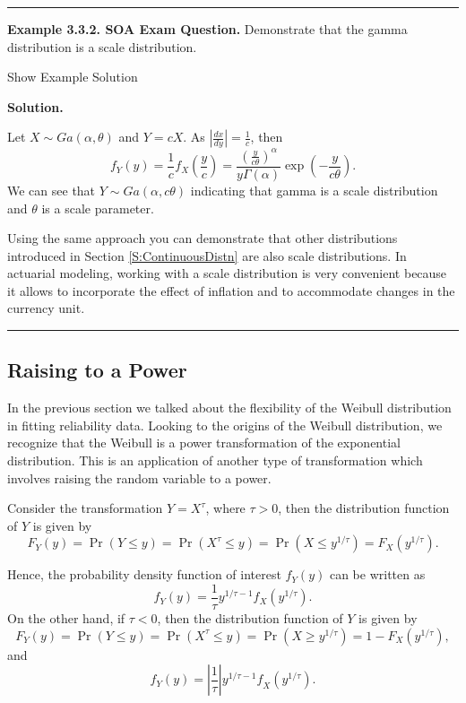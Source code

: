 \documentclass[]{book}
\theoremstyle{definition}
\theoremstyle{definition}
\theoremstyle{definition}
\theoremstyle{remark}
\begin{document}
\begin{center}\rule{0.5\linewidth}{\linethickness}\end{center}

\textbf{Example 3.3.2. SOA Exam Question.} Demonstrate that the gamma
distribution is a scale distribution.

Show Example Solution

\hypertarget{toggleExampleLoss.3.2}{}
\textbf{Solution.}

Let \(X\sim Ga(\alpha,\theta)\) and \(Y = cX\). As
\(\left| \frac{dx}{dy} \right| = \frac{1}{c}\), then
\[f_{Y}\left( y \right) = \frac{1}{c}f_{X}\left( \frac{y}{c} \right) = \frac{\left( \frac{y}{c\theta} \right)^{\alpha}}{y\Gamma\left( \alpha \right)}\exp \left( - \frac{y}{c\theta} \right)  .\]
We can see that \(Y\sim Ga(\alpha,c\theta)\) indicating that gamma is a
scale distribution and \(\theta\) is a scale parameter.

Using the same approach you can demonstrate that other distributions
introduced in Section \ref{S:ContinuousDistn} are also scale
distributions. In actuarial modeling, working with a scale distribution
is very convenient because it allows to incorporate the effect of
inflation and to accommodate changes in the currency unit.

\begin{center}\rule{0.5\linewidth}{\linethickness}\end{center}

\subsection{Raising to a Power}\label{raising-to-a-power}

In the previous section we talked about the flexibility of the Weibull
distribution in fitting reliability data. Looking to the origins of the
Weibull distribution, we recognize that the Weibull is a power
transformation of the exponential distribution. This is an application
of another type of transformation which involves raising the random
variable to a power.

Consider the transformation \(Y = X^{\tau}\), where \(\tau > 0\), then
the distribution function of \(Y\) is given by
\[F_{Y}\left( y \right) = \Pr\left( Y \leq y \right) = \Pr\left( X^{\tau} \leq y \right) = \Pr\left( X \leq y^{1/ \tau} \right) = F_{X}\left( y^{1/ \tau} \right).\]

Hence, the probability density function of interest \(f_{Y}(y)\) can be
written as
\[f_{Y}(y) = \frac{1}{\tau} y^{1/ \tau - 1} f_{X}\left( y^{1/ \tau} \right).\]
On the other hand, if \(\tau < 0\), then the distribution function of
\(Y\) is given by
\[F_{Y}\left( y \right) = \Pr\left( Y \leq y \right) = \Pr\left( X^{\tau} \leq y \right) = \Pr\left( X \geq y^{1/ \tau} \right) = 1 - F_{X}\left( y^{1/ \tau} \right), \]
and
\[f_{Y}(y) = \left| \frac{1}{\tau} \right|{y^{1/ \tau - 1}f}_{X}\left( y^{1/ \tau} \right).\]
\end{document}
